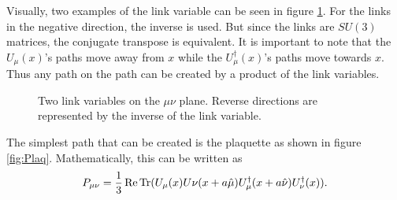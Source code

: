 \documentclass[11pt]{article}
\begin{document}
Visually, two examples of the link variable can be seen in figure \ref{fig:LinkVar}. For the links in the negative direction, the inverse is used. But since the links are $SU(3)$ matrices, the conjugate transpose is equivalent. It is important to note that the $U_\mu(x)$'s paths move away from $x$ while the $U^\dagger_\mu(x)$'s paths move towards $x$. Thus any path on the path can be created by a product of the link variables.
\begin{figure}[h]
\centering
{}
\caption{Two link variables on the $\mu\nu$ plane. Reverse directions are represented by the inverse of the link variable.} \label{fig:LinkVar}
\end{figure}

The simplest path that can be created is the plaquette as shown in figure \ref{fig:Plaq}. Mathematically, this can be written as
\begin{align}
	P_{\mu\nu}=\frac{1}{3}\Re\Trace(U_\mu(x)U\nu(x+a\hat{\mu})U_\mu^\dagger(x+a\hat{\nu})U_\nu^\dagger(x)).
	\label{eq:Plaq}
\end{align}
\end{document}
